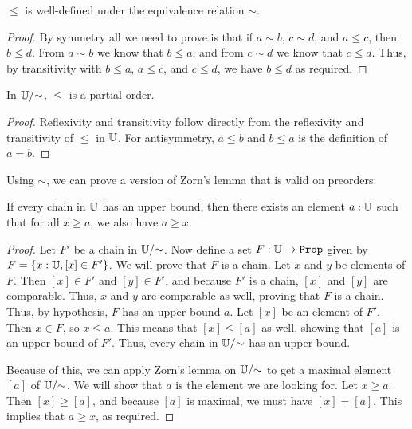 \documentclass[../math.tex]{subfiles}
\begin{document}
\begin{lemma}
    $\leq$ is well-defined under the equivalence relation $\sim$.
\end{lemma}
\begin{proof}
    By symmetry all we need to prove is that if $a \sim b$, $c \sim d$, and $a
    \leq c$, then $b \leq d$.  From $a \sim b$ we know that $b \leq a$, and from
    $c \sim d$ we know that $c \leq d$.  Thus, by transitivity with $b \leq a$,
    $a \leq c$, and $c \leq d$, we have $b \leq d$ as required.
\end{proof}

\begin{instance}
    In $\mathbb{U}/{\sim}$, $\leq$ is a partial order.
\end{instance}
\begin{proof}
    Reflexivity and transitivity follow directly from the reflexivity and
    transitivity of $\leq$ in $\mathbb{U}$.  For antisymmetry, $a \leq b$ and $b \leq a$
    is the definition of $a = b$.
\end{proof}

Using $\sim$, we can prove a version of Zorn's lemma that is valid on preorders:

\begin{theorem} \label{preorder_zorn}
    If every chain in $\mathbb{U}$ has an upper bound, then there exists an element $a :
    \mathbb{U}$ such that for all $x \geq a$, we also have $a \geq x$.
\end{theorem}
\begin{proof}
    Let $F'$ be a chain in $\mathbb{U}/{\sim}$.  Now define a set $F : \U \to \Prop$
    given by $F = \{x : \mathbb{U}, [x] \in F'\}$.  We will prove that $F$ is a chain.
    Let $x$ and $y$ be elements of $F$.  Then $[x] \in F'$ and $[y] \in F'$, and
    because $F'$ is a chain, $[x]$ and $[y]$ are comparable.  Thus, $x$ and $y$
    are comparable as well, proving that $F$ is a chain.  Thus, by hypothesis,
    $F$ has an upper bound $a$.  Let $[x]$ be an element of $F'$.  Then $x \in
    F$, so $x \leq a$.  This means that $[x] \leq [a]$ as well, showing that
    $[a]$ is an upper bound of $F'$.  Thus, every chain in $\mathbb{U}/{\sim}$ has an
    upper bound.

    Because of this, we can apply Zorn's lemma on $\mathbb{U}/{\sim}$ to get a maximal
    element $[a]$ of $\mathbb{U}/{\sim}$.  We will show that $a$ is the element we are
    looking for.  Let $x \geq a$.  Then $[x] \geq [a]$, and because $[a]$ is
    maximal, we must have $[x] = [a]$.  This implies that $a \geq x$, as
    required.
\end{proof}
\end{document}
